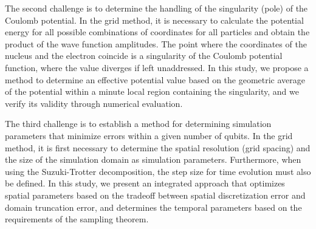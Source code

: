 \documentclass[report_2025.tex]{subfiles}
\begin{document}
The second challenge is to determine the handling of the singularity (pole) of
the Coulomb potential. In the grid method, it is necessary to calculate the
potential energy for all possible combinations of coordinates for all particles
and obtain the product of the wave function amplitudes. The point where the
coordinates of the nucleus and the electron coincide is a singularity of the
Coulomb potential function, where the value diverges if left unaddressed. In
this study, we propose a method to determine an effective potential value based
on the geometric average of the potential within a minute local region
containing the singularity, and we verify its validity through numerical
evaluation.

The third challenge is to establish a method for determining simulation
parameters that minimize errors within a given number of qubits. In the grid
method, it is first necessary to determine the spatial resolution (grid spacing)
and the size of the simulation domain as simulation parameters. Furthermore,
when using the Suzuki-Trotter decomposition, the step size for time evolution
must also be defined. In this study, we present an integrated approach that
optimizes spatial parameters based on the tradeoff between spatial
discretization error and domain truncation error, and determines the temporal
parameters based on the requirements of the sampling theorem.
\end{document}
